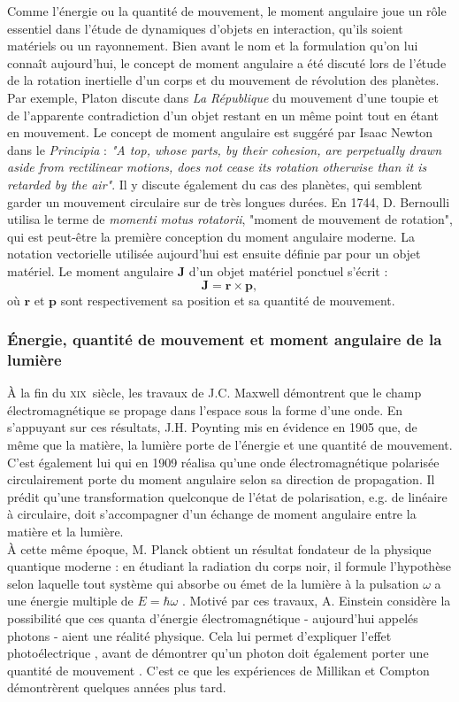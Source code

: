 Comme l'énergie ou la quantité de mouvement, le moment angulaire joue un rôle essentiel dans l'étude de dynamiques d'objets en interaction, qu'ils soient matériels ou un rayonnement. Bien avant le nom et la formulation qu'on lui connaît aujourd'hui, le concept de moment angulaire a été discuté lors de l'étude de la rotation inertielle d'un corps et du mouvement de révolution des planètes. Par exemple, Platon discute dans \textit{La République} du mouvement d'une toupie et de l'apparente contradiction d'un objet restant en un même point tout en étant en mouvement. Le concept de moment angulaire est suggéré par Isaac Newton dans le \textit{Principia} : \textit{"A top, whose parts, by their cohesion, are perpetually drawn aside from rectilinear motions, does not cease its rotation otherwise than it is retarded by the air"}. Il y discute également du cas des planètes, qui semblent garder un mouvement circulaire sur de très longues durées. En 1744, D. Bernoulli utilisa le terme de \textit{momenti motus rotatorii}, "moment de mouvement de rotation", qui est peut-être la première conception du moment angulaire moderne. La notation vectorielle utilisée aujourd'hui est ensuite définie par  pour un objet matériel. Le moment angulaire $\bm{J}$ d'un objet matériel ponctuel s'écrit :
\begin{equation}
\bm{J} = \bm{r}\times\bm{p},
\label{eq:am_matiere}
\end{equation}
où $\bm{r}$ et $\bm{p}$ sont respectivement sa position et sa quantité de mouvement.

\subsubsection{\'Energie, quantité de mouvement et moment angulaire de la lumière}
\`A la fin du \textsc{xix}\ieme ~siècle, les travaux de J.C. Maxwell démontrent que le champ électromagnétique se propage dans l'espace sous la forme d'une onde. En s'appuyant sur ces résultats, J.H. Poynting mis en évidence en 1905 que, de même que la matière, la lumière porte de l'énergie et une quantité de mouvement. C'est également lui qui en 1909 réalisa qu'une onde électromagnétique polarisée circulairement porte du moment angulaire selon sa direction de propagation. Il prédit qu'une transformation quelconque de l'état de polarisation, e.g. de linéaire à circulaire, doit s'accompagner d'un échange de moment angulaire entre la matière et la lumière. \\
\`A cette même époque, M. Planck obtient un résultat fondateur de la physique quantique moderne : en étudiant la radiation du corps noir, il formule l'hypothèse selon laquelle tout système qui absorbe ou émet de la lumière à la pulsation $\omega$ a une énergie multiple de $E = \hbar\omega$ . Motivé par ces travaux, A. Einstein considère la possibilité que ces quanta d'énergie électromagnétique - aujourd'hui appelés photons - aient une réalité physique. Cela lui permet d'expliquer l'effet photoélectrique , avant de démontrer qu'un photon doit également porter une quantité de mouvement . C'est ce que les expériences de Millikan et Compton démontrèrent quelques années plus tard. 

